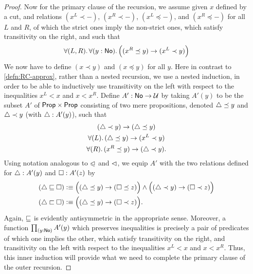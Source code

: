\begin{proof}
  Now for the primary clause of the recursion, we assume given $x$ defined by a cut, and relations $(x^L \prec -)$, $(x^R \prec -)$, $(x^L \preceq -)$, and $(x^R \preceq -)$ for all $L$ and $R$, of which the strict ones imply the non-strict ones, which satisfy transitivity on the right, and such that
  \begin{equation}\label{eq:NO-prec-outer-IH}
    \fall{L,R}{y:\NO}\Big( (x^R\preceq y) \to (x^L \prec y) \Big)
  \end{equation}
  We now have to define $(x\prec y)$ and $(x\preceq y)$ for all $y$.
  Here in contrast to \autoref{defn:RC-approx}, rather than a nested recursion, we use a nested induction, in order to be able to inductively use transitivity on the left with respect to the inequalities $x^L<x$ and $x<x^R$.
  Define $A':\mathsf{No}\to\mathcal{U}$ by taking $A'(y)$ to be the subset $A'$ of $\mathsf{Prop}\times\mathsf{Prop}$ consisting of two mere propositions, denoted $\triangle\preceq y$ and $\triangle\prec y$ (with $\triangle:A'(y)$), such that
  \begin{gather}
    (\tlt y) \to (\tle y)\\
    \fall{L} (\tle y)\to (x^L\prec y) \label{eq:NO-prec-IHL}\\
    \fall{R} (x^R \preceq y) \to (\tlt y) \label{eq:NO-prec-IHR}.
  \end{gather}
  Using notation analogous to $\trianglelefteqslant$ and $\vartriangleleft$, we equip $A'$ with the two relations defined for $\triangle:A'(y)$ and $\square:A'(z)$ by
  \begin{align*}
    (\tlname \bble \tlbname) &\defeq
    \Big((\tle y) \to (\tleb z)\Big) \land \Big((\tlt y) \to (\tltb z)\Big)\\
    (\tlname \bblt \tlbname) &\defeq
    \Big((\tle y) \to (\tltb z)\Big). %
  \end{align*}
  Again, $\sqsubseteq$ is evidently antisymmetric in the appropriate sense.
  Moreover, a function $\prd{y:\NO} A'(y)$ which preserves inequalities is precisely a pair of predicates of which one implies the other, which satisfy transitivity on the right, and transitivity on the left with respect to the inequalities $x^L<x$ and $x<x^R$.
  Thus, this inner induction will provide what we need to complete the primary clause of the outer recursion.


\end{proof}
